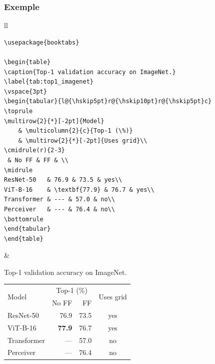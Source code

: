 \documentclass[aspectratio=169]{beamer}
\begin{document}
\begin{frame}[fragile]\frametitle{Exemple}
\vspace{-7mm}

\begin{tabular}{ll}
\tiny
\begin{minipage}{.55\textwidth}
\begin{verbatim}
\usepackage{booktabs}

\begin{table}
\caption{Top-1 validation accuracy on ImageNet.}
\label{tab:top1_imagenet}
\vspace{3pt}
\begin{tabular}{l@{\hskip5pt}r@{\hskip10pt}r@{\hskip5pt}c}
\toprule
\multirow{2}{*}[-2pt]{Model}
    & \multicolumn{2}{c}{Top-1 (\%)}
    & \multirow{2}{*}[-2pt]{Uses grid}\\
\cmidrule(r){2-3}
 & No FF & FF & \\
\midrule
ResNet-50   & 76.9 & 73.5 & yes\\
ViT-B-16    & \textbf{77.9} & 76.7 & yes\\
Transformer & --- & 57.0 & no\\
Perceiver   & --- & 76.4 & no\\
\bottomrule
\end{tabular}
\end{table}
\end{verbatim}
\end{minipage}
& 
\begin{minipage}{.39\textwidth}
\scriptsize\rmfamily
Top-1 validation accuracy on ImageNet.
\vspace{6pt}
\begin{tabular}{l@{\hskip5pt}r@{\hskip10pt}r@{\hskip5pt}c}
\toprule
\multirow{2}{*}[-2pt]{Model}
    & \multicolumn{2}{c}{Top-1 (\%)}
    & \multirow{2}{*}[-2pt]{Uses grid}\\
\cmidrule(r){2-3}
 & No FF & FF & \\
\midrule
ResNet-50   & 76.9 & 73.5 & yes\\
ViT-B-16    & \textbf{77.9} & 76.7 & yes\\
Transformer & --- & 57.0 & no\\
Perceiver   & --- & 76.4 & no\\
\bottomrule
\end{tabular}

\end{minipage}
\end{tabular}

\end{frame}
\end{document}
